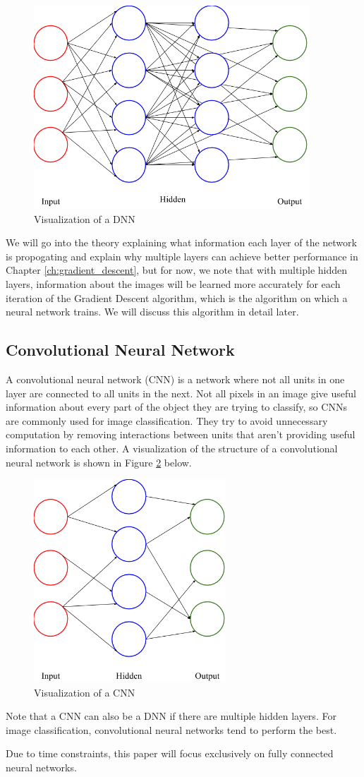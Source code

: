 \begin{figure}[ht!]
\centering
\includegraphics[height=3in]{../figures/deep_nn.png}
\caption{Visualization of a DNN}
\label{fig:dnn}
\end{figure}

We will go into the theory explaining what information each layer of the
network is propogating and explain why multiple layers can achieve better
performance in Chapter \ref{ch:gradient_descent}, but for now, we note that
with multiple hidden layers, information about the images will be learned more
accurately for each iteration of the Gradient Descent algorithm, which is the
algorithm on which a neural network trains. We will discuss this algorithm in
detail later.

\subsection{Convolutional Neural Network}
A convolutional neural network (CNN) is a network where not all units in one
layer are connected to all units in the next. Not all pixels in an image give
useful information about every part of the object they are trying to classify,
so CNNs are commonly used for image classification. They try to avoid
unnecessary computation by removing interactions between units that aren't
providing useful information to each other. A visualization of the structure
of a convolutional neural network is shown in Figure \ref{fig:cnn} below.
\newpage
\begin{figure}[ht!]
\centering
\includegraphics[height=3in]{../figures/convolutional_nn.png}
\caption{Visualization of a CNN}
\label{fig:cnn}
\end{figure}

Note that a CNN can also be a DNN if there are multiple hidden layers. For
image classification, convolutional neural networks tend to perform the best.

\noindent Due to time constraints, this paper will focus exclusively on fully connected
neural networks.
